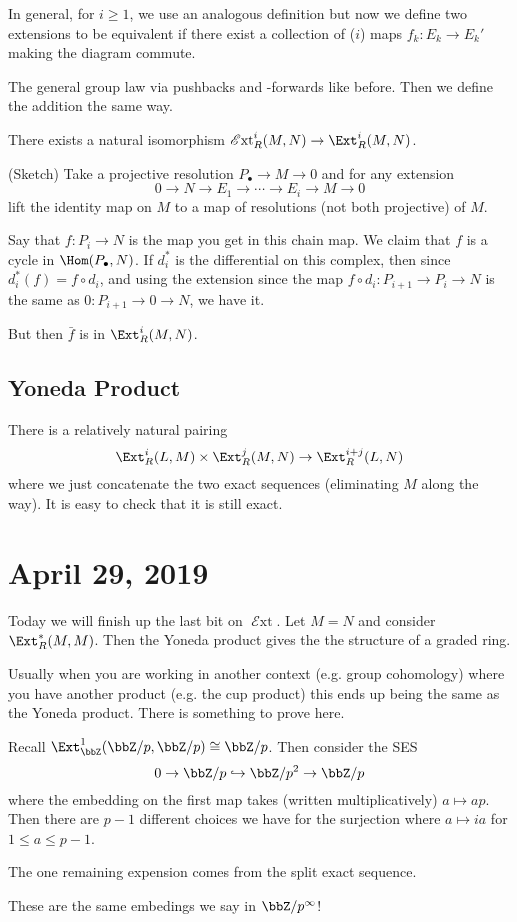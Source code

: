 \documentclass[12pt]{article}
\DeclareMathOperator{\sExt}{\mathscr{E}xt}
\begin{document}
\brk

In general, for $i\ge 1$, we use an analogous definition but now we define two extensions
to be equivalent if there exist a collection of ($i$) maps $f_k:E_k\to E_k'$ making the diagram commute.

The general group law via pushbacks and -forwards like before. Then we define the addition the same way.
\begin{prop}
	There exists a natural isomorphism $\sExt^i_R(M,N)\to \Ext^i_R(M,N)$.
\end{prop}
\begin{prf}
	(Sketch) Take a projective resolution $P_\bullet\to M\to 0$ and for any extension 
	\[0\to N\to E_1\to \cdots\to E_i\to M\to 0\]
	lift the identity map on $M$ to a map of resolutions (not both projective) of $M$.

	Say that $f:P_i\to N$ is the map you get in this chain map. We claim that $f$ is a cycle
	in $\Hom(P_\bullet,N)$. If $d_i^*$ is the differential on this complex, then since $d_i^*(f)=f\circ d_i$,
	and using the extension since the map $f\circ d_i:P_{i+1}\to P_i\to N$ is the same as $0:P_{i+1}\to 0\to N$,
	we have it.

	But then $\bar f$ is in $\Ext_R^i(M,N)$.
\end{prf}

\subsection{Yoneda Product}
There is a relatively natural pairing
\[\Ext_R^i(L,M)\times\Ext_R^j(M,N)\to \Ext_R^{i+j}(L,N)\]
where we just concatenate the two exact sequences (eliminating $M$ along the way). It is easy to 
check that it is still exact.

\section{April 29, 2019}
Today we will finish up the last bit on $\sExt$. Let $M=N$ and consider $\Ext_R^\ast(M,M)$.
Then the Yoneda product gives the the structure of a graded ring.

Usually when you are working in another context (e.g. group cohomology) where you have another 
product (e.g. the cup product) this ends up being the same as the Yoneda product. There is something 
to prove here.

\begin{ex}
	Recall $\Ext_\bbZ^1(\bbZ/p,\bbZ/p)\cong\bbZ/p$. Then consider the SES
	\[0\to \bbZ/p\hookrightarrow\bbZ/p^2\to \bbZ/p\]
	where the embedding on the first map takes (written multiplicatively) $a\mapsto ap$.
	Then there are $p-1$ different choices we have for the surjection where $a\mapsto ia$ for $1\le a\le p-1$.
	
	The one remaining expension comes from the split exact sequence.
\end{ex}
\begin{rmk}
	These are the same embedings we say in $\bbZ/p^\infty$!
\end{rmk}
\end{document}
